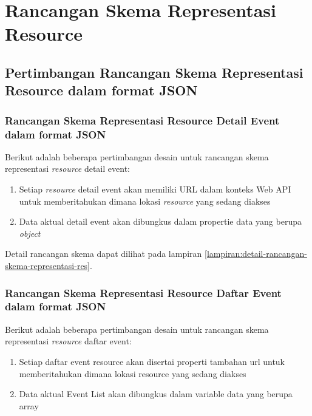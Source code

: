 \documentclass[a4paper, 12pt, oneside]{report}
\begin{document}
\section{Rancangan Skema Representasi Resource}

\subsection{Pertimbangan Rancangan Skema Representasi Resource dalam format JSON}

\subsubsection{Rancangan Skema Representasi Resource Detail Event dalam format JSON}

\onehalfspacing Berikut adalah beberapa pertimbangan desain untuk rancangan skema representasi \textit{resource} detail event:

\begin{enumerate}
  \item Setiap \textit{resource} detail event akan memiliki URL dalam konteks Web API untuk memberitahukan dimana lokasi \textit{resource} yang sedang diakses
  \item Data aktual detail event akan dibungkus dalam propertie data yang berupa \textit{object}
\end{enumerate}

Detail rancangan skema dapat dilihat pada lampiran \ref{lampiran:detail-rancangan-skema-representasi-res}.

\subsubsection{Rancangan Skema Representasi Resource Daftar Event dalam format JSON}

\onehalfspacing Berikut adalah beberapa pertimbangan desain untuk rancangan skema representasi \textit{resource} daftar event:

\begin{enumerate}
  \item Setiap daftar event resource akan disertai properti tambahan url untuk memberitahukan dimana lokasi resource yang sedang diakses
  \item Data aktual Event List akan dibungkus dalam variable data yang berupa array
\end{enumerate}
\end{document}
